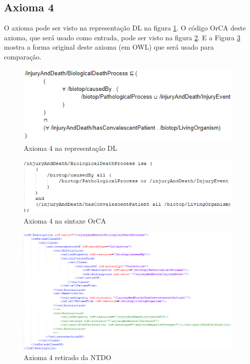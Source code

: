 \documentclass{bcc}
\begin{document}
\subsection{Axioma 4}
O axioma pode ser visto na representação DL na figura \ref{fig:axioma4_dl}. O código OrCA deste axioma, que será usado como entrada, pode ser visto na figura \ref{fig:axioma4_orca}. E a Figura \ref{fig:axioma4_o} mostra a forma original deste axioma (em OWL) que será usado para comparação. 

\begin{figure}[H]
\centering
\includegraphics[width=.6\textwidth]{Figuras/axioma4_dl.png}
\caption{Axioma 4 na representação DL} 
\label{fig:axioma4_dl}
\end{figure}

\begin{figure}[H]
\centering
\includegraphics[width=.7\textwidth]{Figuras/axioma4_orca.png}
\caption{Axioma 4 na sintaxe OrCA} 
\label{fig:axioma4_orca}
\end{figure}

\begin{figure}[H]
\centering
\includegraphics[width=1\textwidth]{Figuras/axioma4_o.png}
\caption{Axioma 4 retirado da NTDO} 
\label{fig:axioma4_o}
\end{figure}
\end{document}

